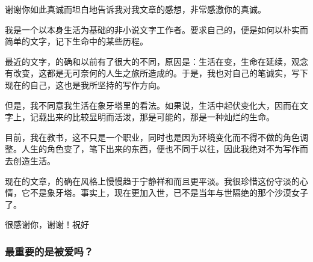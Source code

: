 \par {}
\par 谢谢你如此真诚而坦白地告诉我对我文章的感想，非常感激你的真诚。
\par 我是一个以本身生活为基础的非小说文字工作者。要求自己的，便是如何以朴实而简单的文字，记下生命中的某些历程。
\par 最近的文字，的确和以前有了很大的不同，原因是：生活在变，生命在延续，观念有改变，这都是无可奈何的人生之旅所造成的。于是，我也对自己的笔诚实，写下现在的自己，这也是我所坚持的写作方向。
\par 但是，我不同意我生活在象牙塔里的看法。如果说，生活中起伏变化大，因而在文字上，记载出来的比较显明而活泼，那是可能的，那是一种灿烂的生命。
\par 目前，我在教书，这不只是一个职业，同时也是因为环境变化而不得不做的角色调整。人生的角色变了，笔下出来的东西，便也不同于以往，因此我绝对不为写作而去创造生活。
\par 现在的文章，的确在风格上慢慢趋于宁静祥和而且更平淡。我很珍惜这份守淡的心情，它不是象牙塔。事实上，现在更加入世，已不是当年与世隔绝的那个沙漠女子了。
\par 很感谢你，谢谢！祝好
\par {}


\subsubsection{最重要的是被爱吗？}



